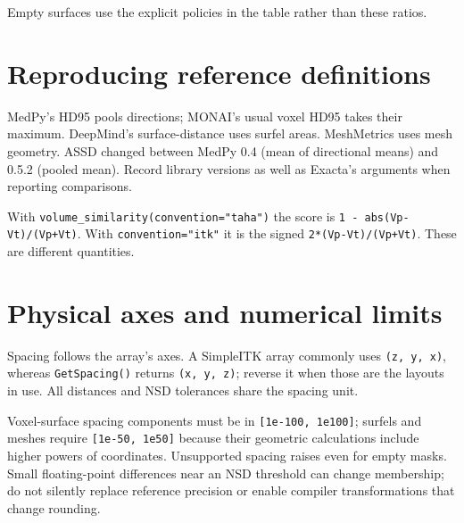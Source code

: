 Empty surfaces use the explicit policies in the table rather than these ratios.

\section{Reproducing reference definitions}\label{conventions:reproducing-reference-definitions}

MedPy's HD95 pools directions; MONAI's usual voxel HD95 takes their maximum. DeepMind's
surface-distance uses surfel areas. MeshMetrics uses mesh geometry. ASSD changed between
MedPy 0.4 (mean of directional means) and 0.5.2 (pooled mean). Record library versions as well
as Exacta's arguments when reporting comparisons.

With \texttt{volume\_similarity(convention="taha")} the score is \texttt{1\ -\ abs(Vp-Vt)/(Vp+Vt)}.
With \texttt{convention="itk"} it is the signed \texttt{2*(Vp-Vt)/(Vp+Vt)}. These are different quantities.

\section{Physical axes and numerical limits}\label{conventions:physical-axes-and-numerical-limits}

Spacing follows the array's axes. A SimpleITK array commonly uses \texttt{(z,\ y,\ x)}, whereas
\texttt{GetSpacing()} returns \texttt{(x,\ y,\ z)}; reverse it when those are the layouts in use.
All distances and NSD tolerances share the spacing unit.

Voxel-surface spacing components must be in \texttt{{[}1e-100,\ 1e100{]}}; surfels and meshes require
\texttt{{[}1e-50,\ 1e50{]}} because their geometric calculations include higher powers of coordinates.
Unsupported spacing raises even for empty masks. Small floating-point differences near
an NSD threshold can change membership; do not silently replace reference precision or
enable compiler transformations that change rounding.

